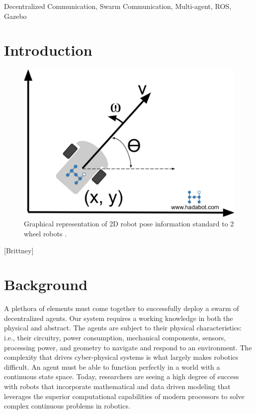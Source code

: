 \documentclass[conference]{IEEEtran}
\begin{document}
\begin{IEEEkeywords}
Decentralized Communication, Swarm Communication, Multi-agent, ROS, Gazebo
\end{IEEEkeywords}

\section{Introduction}
\begin{figure}
	\includegraphics[width=\linewidth]{hadabot_unicycle_diagram_01.jpg}
	\caption{Graphical representation of 2D robot pose information standard to 2 wheel robots \cite{RN109}.}
\end{figure}
[Brittney]

\section{Background} 
A plethora of elements must come together to successfully deploy a swarm of decentralized agents. Our system requires a working knowledge in both the physical and abstract. The agents are subject to their physical characteristics: i.e., their circuitry, power consumption, mechanical components, sensors, processing power, and geometry to navigate and respond to an environment. The complexity that drives cyber-physical systems is what largely makes robotics difficult. An agent must be able to function perfectly in a world with a continuous state space. Today, researchers are seeing a high degree of success with robots that incorporate mathematical and data driven modeling that leverages the superior computational capabilities of modern processors to solve complex continuous problems in robotics. 
\end{document}
